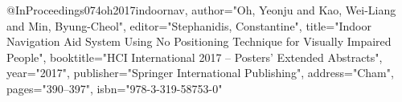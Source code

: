 @InProceedings{074oh2017indoornav,
author="Oh, Yeonju
and Kao, Wei-Liang
and Min, Byung-Cheol",
editor="Stephanidis, Constantine",
title="Indoor Navigation Aid System Using No Positioning Technique for Visually Impaired People",
booktitle="HCI International 2017 -- Posters' Extended Abstracts",
year="2017",
publisher="Springer International Publishing",
address="Cham",
pages="390--397",
isbn="978-3-319-58753-0"
}